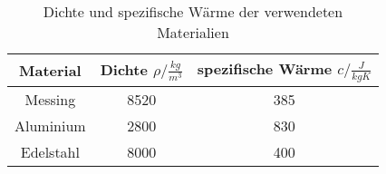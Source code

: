 \begin{table}[!htp]
\centering
\caption{Dichte und spezifische Wärme der verwendeten Materialien \cite[2]{v204}}
\label{tab:materialkonst}
\begin{tabular}{c c c}
\toprule
{Material} & { Dichte $\rho / \frac{kg}{m^3}$} & { spezifische Wärme $c / \frac{J}{kgK}$} \\
\midrule
Messing & 8520 & 385 \\
Aluminium & 2800 & 830 \\
Edelstahl & 8000 & 400 \\
\bottomrule
\end{tabular}
\end{table}